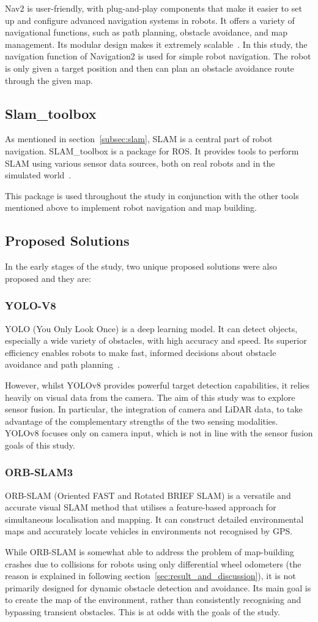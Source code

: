 Nav2 is user-friendly, with plug-and-play components 
that make it easier to set up and configure advanced navigation systems in robots. 
It offers a variety of navigational functions, 
such as path planning, obstacle avoidance, and map management. Its modular design makes it extremely scalable~\cite{nav2doc}. 
In this study, the navigation function of Navigation2 is used for simple robot navigation. 
The robot is only given a target position and then can plan an obstacle avoidance route through the given map.
\subsection{Slam\_toolbox}
As mentioned in section~\ref{subsec:slam}, SLAM is a central part of robot navigation. SLAM\_toolbox is a package for ROS. 
It provides tools to perform SLAM using various sensor data sources, both on real robots and in the simulated world~\cite{slamtoolbox}.

This package is used throughout the study in conjunction with the other tools mentioned above to implement robot navigation and map building.

\subsection{Proposed Solutions}
In the early stages of the study, two unique proposed solutions were also proposed and they are:
\subsubsection{YOLO-V8}
YOLO (You Only Look Once) is a deep learning model. 
It can detect objects, especially a wide variety of obstacles, with high accuracy and speed. 
Its superior efficiency enables robots to make fast, informed decisions about obstacle avoidance and path planning~\cite{yolo}.

However, whilst YOLOv8 provides powerful target detection capabilities, 
it relies heavily on visual data from the camera. 
The aim of this study was to explore sensor fusion. In particular, the integration of camera and LiDAR data, 
to take advantage of the complementary strengths of the two sensing modalities. 
YOLOv8 focuses only on camera input, which is not in line with the sensor fusion goals of this study.
\subsubsection{ORB-SLAM3}
ORB-SLAM (Oriented FAST and Rotated BRIEF SLAM) is a versatile and accurate visual SLAM method 
that utilises a feature-based approach for simultaneous localisation and mapping. 
It can construct detailed environmental maps and accurately locate vehicles in environments not recognised by GPS.

While ORB-SLAM is somewhat able to address the problem of map-building crashes due to collisions for robots using only differential wheel odometers
(the reason is explained in following section~\ref{sec:result_and_discussion}),
it is not primarily designed for dynamic obstacle detection and avoidance. 
Its main goal is to create the map of the environment, rather than consistently recognising and bypassing transient obstacles.
This is at odds with the goals of the study.
